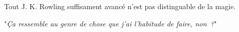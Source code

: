 Tout J. K. Rowling suffisament avancé n'est pas distinguable de la magie.

"\emph{Ça ressemble au genre de chose que j'ai l'habitude de faire, non~?}"

